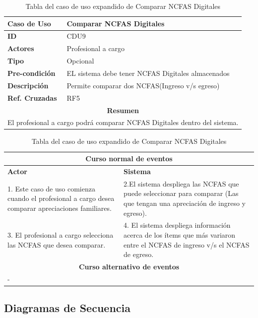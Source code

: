 \begin{table}
	\centering
	\begin{tabular}{|p{6cm} |p{6cm}|}
		\hline \textbf{Caso de Uso} & Comparar NCFAS Digitales \\ 
		\hline \textbf{ID} & CDU9 \\ 
		\hline \textbf{Actores} & Profesional a cargo \\ 
		\hline \textbf{Tipo} & Opcional \\ 
		\hline \textbf{Pre-condición} & EL sistema debe tener NCFAS Digitales almacenados \\ 
		\hline \textbf{Descripción} & Permite comparar dos NCFAS(Ingreso v/s egreso) \\
		\hline \textbf{Ref. Cruzadas} & RF5 \\ 
		\hline
		\multicolumn{2}{|c|}{\textbf{Resumen}} \\
		\hline
		\multicolumn{2}{|p{12cm}|}{El profesional a cargo podrá comparar NCFAS Digitales dentro del sistema.} \\
		
	\end{tabular}  
	\begin{tabular}{|p{6cm}|p{6cm}|}
		\multicolumn{2}{|c|}{\textbf{Curso normal de eventos}} \\
		\hline \textbf{Actor} & \textbf{Sistema} \\ 
		\hline 1. Este caso de uso comienza cuando el profesional a cargo desea comparar apreciaciones familiares. & 2.El sistema despliega las NCFAS que puede seleccionar para comparar (Las que tengan una apreciación de ingreso y egreso).  \\ 
		3. El profesional a cargo selecciona las NCFAS que desea comparar.& 4. El sistema despliega información acerca de los ítems que más variaron entre el NCFAS de ingreso v/s el NCFAS de egreso. \\
		\hline
		\multicolumn{2}{|c|}{\textbf{Curso alternativo de eventos}} \\
		\hline
		\multicolumn{2}{|p{12cm}|}{ - } \\
		\hline
	\end{tabular}
	\caption{Tabla del caso de uso expandido de Comparar NCFAS Digitales}
	\label{tabcdu9}
\end{table}

\newpage
\clearpage

\subsection{Diagramas de Secuencia}

